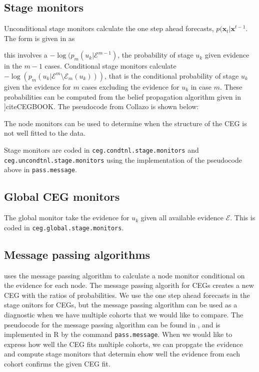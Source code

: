 \documentclass[12pt]{article}
\begin{document}
 

\subsection{Stage monitors}
 
 Unconditional stage monitors calculate the one step ahead forecasts, $p(\bm{x}_t  | \bm{x}^{t-1}$. The form is given in \cite{Freeman} as 
 
 this involves a $-\log (p_m(u_k | \mathcal{E}^{m-1})$, the probability of stage $u_k$ given evidence in the $m-1$ cases. 
 Conditional stage monitors calculate $-\log (p_m(u_k | \mathcal{E}^m \setminus \mathcal{E}_m(u_k)))$, that is the conditional probability of stage $u_k$ given the evidence for $m$ cases excluding the evidence for $u_k$ in case $m$. These probabilities can be computed from the belief propagation algorithm given in ]cite{CEGBOOK}. The pseudocode from Collazo is shown below:
 
 The node monitors can be used to determine when the structure of the CEG is not well fitted to the data.
 
 
 Stage monitors are coded in \texttt{ceg.condtnl.stage.monitors} and \texttt{ceg.uncondtnl.stage.monitors} using the implementation of the pseudocode above in \texttt{pass.message}.

 
 
\subsection{Global CEG monitors}

The global monitor take the evidence for $u_k$ given all available evidence $\mathcal{E}$. This is coded in \texttt{ceg.global.stage.monitors}. 


\subsection{Message passing algorithms}

\cite{diagnostics} uses the message passing algorithm to calculate a node monitor conditional on the evidence for each node. The message passing algorith for CEGs  creates a new CEG with the ratios of probabilities. We use the one step ahead forecasts in the stage onitors for CEGs, but the message passing algorithm can be used as a diagnostic when we have multiple cohorts that we would like to compare. The pseudocode for the message passing algorithm can be found in \cite{Rodriguo}, and is implemented in R by the command \texttt{pass.message}. When we would like to express how well the CEG fits multiple cohorts, we can propgate the evidence and compute stage monitors that determin ehow well the evidence from each cohort confirms the given CEG fit. 
\end{document}
